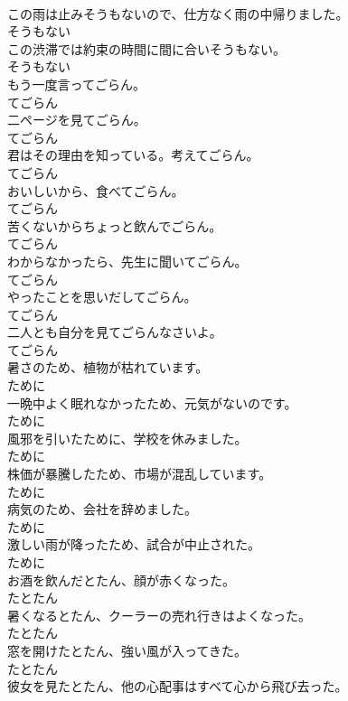 \documentclass[8pt]{extreport}
\begin{document}
\begin{CJK}{UTF8}{min}
\\	この雨は止みそうもないので、仕方なく雨の中帰りました。	
\\	そうもない	
\\	この渋滞では約束の時間に間に合いそうもない。	
\\	そうもない	
\\	もう一度言ってごらん。	
\\	てごらん	
\\	二ページを見てごらん。	
\\	てごらん	
\\	君はその理由を知っている。考えてごらん。	
\\	てごらん	
\\	おいしいから、食べてごらん。	
\\	てごらん	
\\	苦くないからちょっと飲んでごらん。	
\\	てごらん	
\\	わからなかったら、先生に聞いてごらん。	
\\	てごらん	
\\	やったことを思いだしてごらん。	
\\	てごらん	
\\	二人とも自分を見てごらんなさいよ。	
\\	てごらん	
\\	暑さのため、植物が枯れています。	
\\	ために	
\\	一晩中よく眠れなかったため、元気がないのです。	
\\	ために	
\\	風邪を引いたために、学校を休みました。	
\\	ために	
\\	株価が暴騰したため、市場が混乱しています。	
\\	ために	
\\	病気のため、会社を辞めました。	
\\	ために	
\\	激しい雨が降ったため、試合が中止された。	
\\	ために	
\\	お酒を飲んだとたん、顔が赤くなった。	
\\	たとたん	
\\	暑くなるとたん、クーラーの売れ行きはよくなった。	
\\	たとたん	
\\	窓を開けたとたん、強い風が入ってきた。	
\\	たとたん	
\\	彼女を見たとたん、他の心配事はすべて心から飛び去った。	

\end{CJK}
\end{document}
